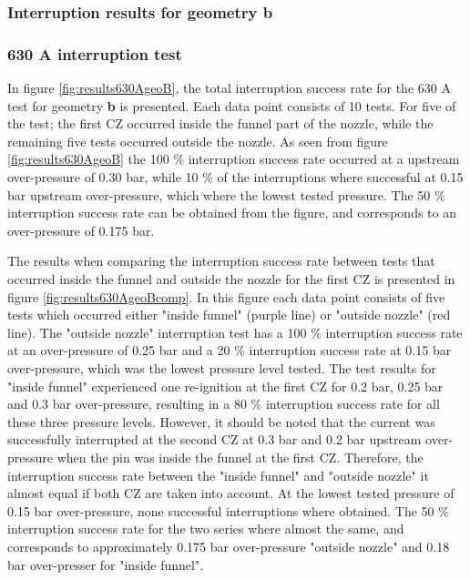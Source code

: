 \documentclass[10pt,b5paper,twoside]{article}
\begin{document}
\subsubsection{Interruption results for geometry \textbf{b}} \label{sec:intTestGeoB}

\subsubsection*{630 A interruption test}

In figure \ref{fig:results630AgeoB}, the total interruption success rate for the 630 A test for geometry \textbf{b} is presented. Each data point consists of 10 tests. For five of the test; the first CZ occurred inside the funnel part of the nozzle, while the remaining five tests occurred outside the nozzle. As seen from figure \ref{fig:results630AgeoB} the 100 \% interruption success rate occurred at a upstream over-pressure of 0.30 bar, while 10 \% of the interruptions where successful at 0.15 bar upstream over-pressure, which where the lowest tested pressure. The 50 \% interruption success rate can be obtained from the figure, and corresponds to an over-pressure of 0.175 bar.

The results when comparing the interruption success rate between tests that occurred inside the funnel and outside the nozzle for the first CZ is presented in figure \ref{fig:results630AgeoBcomp}. In this figure each data point consists of five tests which occurred either "inside funnel" (purple line) or "outside nozzle" (red line). The "outside nozzle" interruption test has a 100 \% interruption success rate at an over-pressure of 0.25 bar and a 20 \% interruption success rate at 0.15 bar over-pressure, which was the lowest pressure level tested. The test results for "inside funnel" experienced one re-ignition at the first CZ for 0.2 bar, 0.25 bar and 0.3 bar over-pressure, resulting in a 80 \% interruption success rate for all these three pressure levels. However, it should be noted that the current was successfully interrupted at the second CZ at 0.3 bar and 0.2 bar upstream over-pressure when the pin was inside the funnel at the first CZ. Therefore, the interruption success rate between the "inside funnel" and "outside nozzle" it almost equal if both CZ are taken into account. At the lowest tested pressure of 0.15 bar over-pressure, none successful interruptions where obtained. The 50 \% interruption success rate for the two series where almost the same, and corresponds to approximately 0.175 bar over-pressure "outside nozzle" and 0.18 bar over-presser for "inside funnel". 
\end{document}
